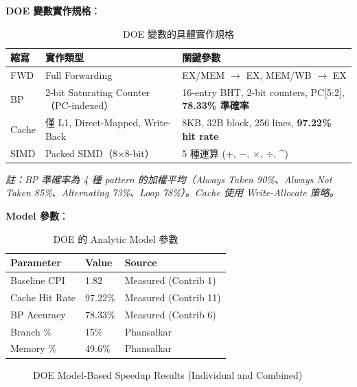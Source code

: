 \documentclass[journal]{IEEEtran}
\begin{document}
\textbf{DOE 變數實作規格}：
\begin{table}[!t]
\centering
\caption{DOE 變數的具體實作規格}
\label{tab:doespec}
\footnotesize
\begin{tabular}{@{}llp{4.2cm}@{}}
\toprule
\textbf{縮寫} & \textbf{實作類型} & \textbf{關鍵參數} \\
\midrule
FWD & Full Forwarding & EX/MEM $\to$ EX, MEM/WB $\to$ EX \\
BP & 2-bit Saturating Counter（PC-indexed） & 16-entry BHT, 2-bit counters, PC[5:2], \textbf{78.33\% 準確率} \\
Cache & 僅 L1, Direct-Mapped, Write-Back & 8KB, 32B block, 256 lines, \textbf{97.22\% hit rate} \\
SIMD & Packed SIMD（8$\times$8-bit） & 5 種運算 (+, $-$, $\times$, $\div$, \^{}) \\
\bottomrule
\end{tabular}
\end{table}

\textit{註：BP 準確率為 4 種 pattern 的加權平均（Always Taken 90\%、Always Not Taken 85\%、Alternating 73\%、Loop 78\%）。Cache 使用 Write-Allocate 策略。}

\textbf{Model 參數}：
\begin{table}[!t]
\centering
\caption{DOE 的 Analytic Model 參數}
\footnotesize
\begin{tabular}{@{}lll@{}}
\toprule
\textbf{Parameter} & \textbf{Value} & \textbf{Source} \\
\midrule
Baseline CPI & 1.82 & Measured (Contrib 1) \\
Cache Hit Rate & 97.22\% & Measured (Contrib 11) \\
BP Accuracy & 78.33\% & Measured (Contrib 6) \\
Branch \% & 15\% & Phansalkar~\cite{phansalkar2007analysis} \\
Memory \% & 49.6\% & Phansalkar~\cite{phansalkar2007analysis} \\
\bottomrule
\end{tabular}
\end{table}



\begin{figure}[!t]
\centering
{}
\caption{DOE Model-Based Speedup Results (Individual and Combined)}
\label{fig:doe}
\end{figure}
\end{document}
